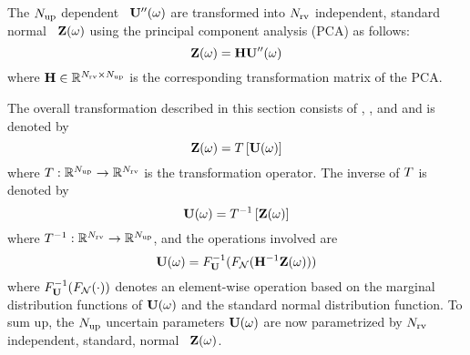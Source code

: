  The ${N_\text{up}}$ dependent \rvs\ $\mathbf{U}''(\omega)$ are transformed into ${N_\text{rv}}$ independent, standard normal \rvs\ $\mathbf{Z}(\omega)$ using the principal component analysis (PCA) as follows:
\begin{equation} \elabel{independent-normal}
  \vZ(\o) = \m{H} \vU''(\o)
\end{equation}
where $\mathbf{H} \in \mathbb{R}^{{N_\text{rv}} \times {N_\text{up}}}$ is the corresponding transformation matrix of the PCA.

The overall transformation described in this section consists of , , and  and is denoted by
\[
  \vZ(\o) = \oT{\vU(\o)}
\]
where $\oT: \real^\Nup \to \real^\Nrv$ is the transformation operator. The inverse of $\oT$ is denoted by
\[
  \vU(\o) = \oInvT{\vZ(\o)}
\]
where $\oInvT: \real^\Nrv \to \real^\Nup$, and the operations involved are
\[
  \mathbf{U}(\omega) = F_{\mathbf{U}}^{-1}(F_{\mathcal{N}}(\mathbf{H}^{-1} \mathbf{Z}(\omega)))
\]
where $F^{-1}_{\mathbf{U}}(F_{\mathcal{N}}(\cdot))$ denotes an element-wise operation based on the marginal distribution functions of $\mathbf{U}(\omega)$ and the standard normal distribution function. To sum up, the ${N_\text{up}}$ uncertain parameters $\mathbf{U}(\omega)$ are now parametrized by ${N_\text{rv}}$ independent, standard, normal \rvs\ $\mathbf{Z}(\omega)$.
